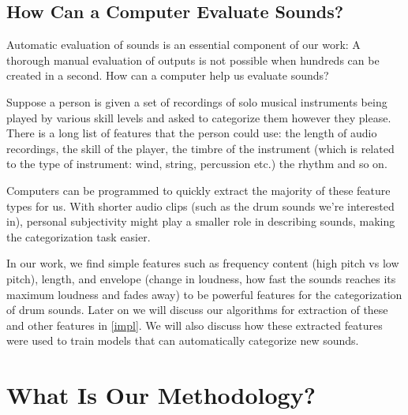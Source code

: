 \documentclass[\main/thesis.tex]{subfiles}
\begin{document}
 
 
 
 

\subsection{How Can a Computer Evaluate Sounds?}
Automatic evaluation of sounds is an essential component of our work: A thorough manual evaluation of outputs is not possible when hundreds can be created in a second. How can a computer help us evaluate sounds?

Suppose a person is given a set of recordings of solo musical instruments being played by various skill levels and asked to categorize them however they please. There is a long list of features that the person could use: the length of audio recordings, the skill of the player, the timbre of the instrument (which is related to the type of instrument: wind, string, percussion etc.) the rhythm and so on. 

 Computers can be programmed to quickly extract the majority of these feature types for us. With shorter audio clips (such as the drum sounds we're interested in), personal subjectivity might play a smaller role in describing sounds, making the categorization task easier.

In our work, we find simple features such as frequency content (high pitch vs low pitch), length, and envelope (change in loudness, how fast the sounds reaches its maximum loudness and fades away) to be powerful features for the categorization of drum sounds. Later on we will discuss our algorithms for extraction of these and other features in \ref{impl}. We will also discuss how these extracted features were used to train models that can automatically categorize new sounds.  

\section{What Is Our Methodology?}
\end{document}

